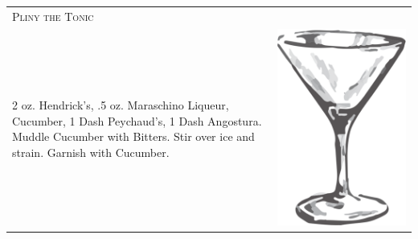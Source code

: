 \documentclass{article}
\begin{document}
\begin{tabular}{p{2in} p{0.5in}}
\multicolumn{2}{p{3in}}{\centering\Huge\textsc{Pliny the Tonic}} \\ 
   \vspace{-0.1in}2 oz. Hendrick's, .5 oz. Maraschino Liqueur, Cucumber, 1 Dash Peychaud's, 1 Dash Angostura. Muddle Cucumber with Bitters. Stir over ice and strain. Garnish with Cucumber. &
   \vspace{-0.1in} \includegraphics{goblet.png}
\end{tabular}
\end{document}
